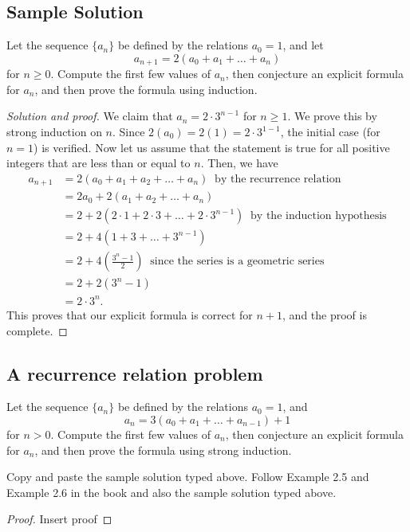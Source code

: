 \documentclass[11pt]{amsart}
\begin{document}
\subsection{Sample Solution}
Let the sequence $\{ a_n\}$ be defined by the relations $a_0=1$, and let
\[
a_{n+1} = 2(a_0 + a_1 + \dots + a_n) 
\]
for $n \geq 0$. 
Compute the first few values of $a_n$, then conjecture an explicit formula for $a_n$, and then prove the formula using induction.
\begin{proof}[Solution and proof]
	We claim that $a_n = 2 \cdot 3^{n-1}$ for $n \geq 1$. We prove this by strong induction on $n$.
	Since $2(a_0)=2(1)=2\cdot 3^{1-1}$, the initial case (for $n=1$) is verified.  
	Now let us assume that the statement is true for all positive integers that are less than or equal to $n$. Then, we have
	\begin{align*}
		a_{n+1} &= 2(a_0 + a_1 + a_2 + \dots + a_n) ~ \text{ by the recurrence relation}\\
		&= 2 a_0 + 2 (a_1 + a_2 + \dots +  a_n)\\
		&= 2 + 2(2 \cdot 1 + 2 \cdot 3 + \dots + 2 \cdot 3^{n-1}) ~ \text{ by the induction hypothesis}\\
		&= 2 + 4 ( 1 +  3 + \dots +  3^{n-1})\\
		&= 2 + 4 \left( \frac{3^n - 1}{2}  \right) ~ \text{ since the series is a geometric series} \\
		&= 2 + 2 (3^n - 1) \\
		&= 2 \cdot 3^n.
	\end{align*}
	This proves that our explicit formula is correct for $n+1$, and the proof is complete.
\end{proof}


\subsection{A recurrence relation problem}
\label{sec:recurrence_relation}
Let the sequence $\{ a_n\}$ be defined by the relations $a_0=1$, and 
\[
a_n = 3(a_0 + a_1 + \dots + a_{n-1}) + 1
\]
for $n>0$. 
Compute the first few values of $a_n$, then conjecture an explicit formula for $a_n$, and then prove the formula using strong induction.

Copy and paste the sample solution typed above.  Follow Example 2.5 and Example 2.6 in the book and also the sample solution typed above.

\begin{proof}
	Insert proof
\end{proof}
\end{document}
